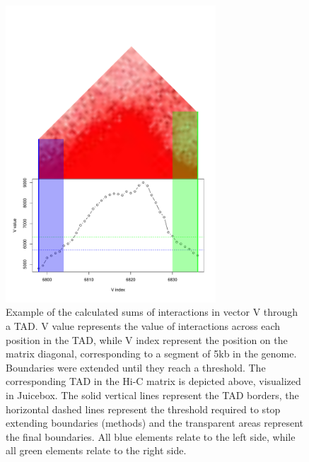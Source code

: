 \documentclass[11pt,a4paper]{report}
\begin{document}
\begin{figure}[ht]
	\includegraphics[width=0.7\textwidth]{Figures/5_boundary_example.pdf}
	\caption{Example of the calculated sums of interactions in vector V through a TAD. V value represents the value of interactions across each position in the TAD, while V index represent the position on the matrix diagonal, corresponding to a segment of 5kb in the genome. Boundaries were extended until they reach a threshold. The corresponding TAD in the Hi-C matrix is depicted above, visualized in Juicebox. The solid vertical lines represent the TAD borders, the horizontal dashed lines represent the threshold required to stop extending boundaries (methods) and the transparent areas represent the final boundaries. All blue elements relate to the left side, while all green elements relate to the right side.}
	\label{boundary_ex}
\end{figure}
\end{document}
